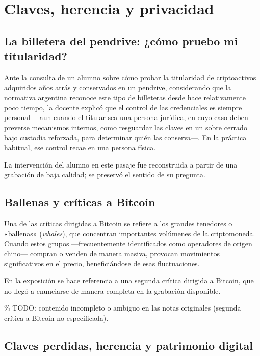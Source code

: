 \documentclass[12pt,oneside]{book}
\begin{document}
\chapter{Claves, herencia y privacidad}

\section{La billetera del pendrive: ¿cómo pruebo mi titularidad?}

Ante la consulta de un alumno sobre cómo probar la titularidad de criptoactivos adquiridos años atrás y conservados en un pendrive, considerando que la normativa argentina reconoce este tipo de billeteras desde hace relativamente poco tiempo, la docente explicó que el control de las credenciales es siempre personal —aun cuando el titular sea una persona jurídica, en cuyo caso deben preverse mecanismos internos, como resguardar las claves en un sobre cerrado bajo custodia reforzada, para determinar quién las conserva—. En la práctica habitual, ese control recae en una persona física.

\begin{note}
La intervención del alumno en este pasaje fue reconstruida a partir de una grabación de baja calidad; se preservó el sentido de su pregunta.
\end{note}

\section{Ballenas y críticas a Bitcoin}

Una de las críticas dirigidas a Bitcoin se refiere a los grandes tenedores o «ballenas» (\textit{whales}), que concentran importantes volúmenes de la criptomoneda. Cuando estos grupos —frecuentemente identificados como operadores de origen chino— compran o venden de manera masiva, provocan movimientos significativos en el precio, beneficiándose de esas fluctuaciones.

\begin{note}
En la exposición se hace referencia a una segunda crítica dirigida a Bitcoin, que no llegó a enunciarse de manera completa en la grabación disponible.

\% TODO: contenido incompleto o ambiguo en las notas originales (segunda crítica a Bitcoin no especificada).
\end{note}

\section{Claves perdidas, herencia y patrimonio digital}
\end{document}
